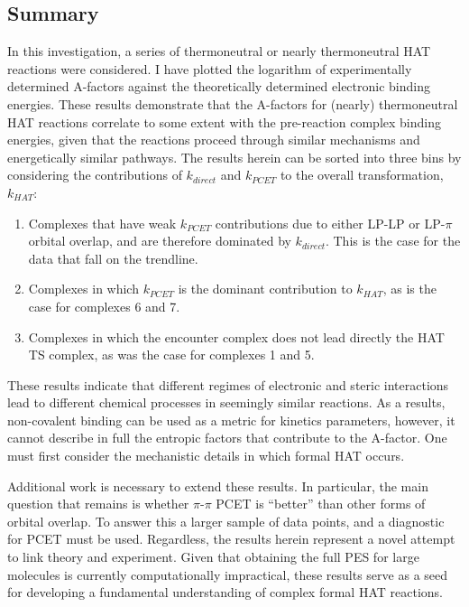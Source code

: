 \begin{doublespace}
\section{Summary}

In this investigation, a series of thermoneutral or nearly thermoneutral HAT
reactions were considered. I have plotted the logarithm of experimentally
determined A-factors against the theoretically determined electronic binding
energies. These results demonstrate that the A-factors for (nearly)
thermoneutral HAT reactions correlate to some extent with the pre-reaction
complex binding energies, given that the reactions proceed through similar
mechanisms and energetically similar pathways. The results herein can be sorted
into three bins by considering the contributions of $k_{direct}$ and $k_{PCET}$
to the overall transformation, $k_{HAT}$:

\begin{enumerate}
  \item Complexes that have weak $k_{PCET}$ contributions due to either LP-LP
	  or LP-$\pi$ orbital overlap, and are therefore dominated by
	  $k_{direct}$. This is the case for the data that fall on the
	  trendline.

  \item Complexes in which $k_{PCET}$ is the dominant contribution to
	  $k_{HAT}$, as is the case for complexes 6 and 7.

  \item Complexes in which the encounter complex does not lead directly the
  HAT TS complex, as was the case for complexes 1 and 5.
\end{enumerate}

These results indicate that different regimes of electronic and steric
interactions lead to different chemical processes in seemingly similar
reactions. As a results, non-covalent binding can be used as a metric for
kinetics parameters, however, it cannot describe in full the entropic factors
that contribute to the A-factor. One must first consider the mechanistic
details in which formal HAT occurs.

Additional work is necessary to extend these results. In particular, the main
question that remains is whether $\pi$-$\pi$ PCET is ``better'' than other
forms of orbital overlap. To answer this a larger sample of data points, and a
diagnostic for PCET must be used. Regardless, the results herein represent a
novel attempt to link theory and experiment. Given that obtaining the full PES
for large molecules is currently computationally impractical, these results
serve as a seed for developing a fundamental understanding of complex formal HAT
reactions.

\end{doublespace}
